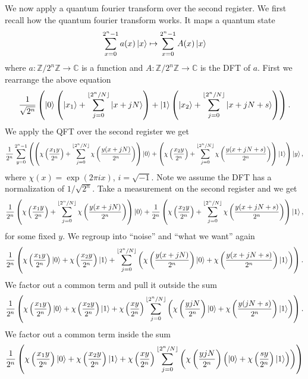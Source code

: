 \documentclass[10pt]{article}
\theoremstyle{plain}
\theoremstyle{definition}
\newcommand{\Z}{\mathbb{Z}}
\newcommand{\C}{\mathbb{C}}
\begin{document}
We now apply a quantum fourier transform over the second register.
We first recall how the quantum fourier transform works.
It maps a quantum state
\[
    \sum_{x=0}^{2^n-1} a(x)\ket{x} \mapsto \sum_{x=0}^{2^n-1} A(x)\ket{x}
\]
where \( a: \Z / 2^n \Z \to \C \) is a function and \( A : \Z / 2^n \Z \to \C\) is the DFT of \( a \).
First we rearrange the above equation
\[
    \frac{1}{\sqrt{2^n}} \left(\ket{0}\left(\ket{x_1} + \sum_{j=0}^{\lfloor 2^n / N \rfloor }\ket{x + jN} \right) + \ket{1} \left(\ket{x_2} + \sum_{j=0}^{\lfloor 2^n / N \rfloor }\ket{x + jN + s}\right) \right) .
\]
We apply the QFT over the second register we get
\[
    \frac{1}{2^n}\sum_{y = 0}^{2^n - 1} \left(  \left(\chi\left(\frac{x_1y}{ 2^n}\right) + \sum_{j = 0}^{\lfloor 2^n / N \rfloor } \chi\left(\frac{y(x+jN)}{2^n}\right) \right) \ket{0}  +  \left( \chi\left(\frac{x_2y}{ 2^n}\right) + \sum_{j = 0}^{\lfloor 2^n / N \rfloor } \chi\left(\frac{y(x+jN + s)}{2^n}\right)\right) \ket{1} \right)\ket{y} ,
\]
where \( \chi(x) = \exp(2\pi ix) \), \( i = \sqrt{-1} \).
Note we assume the DFT has a normalization of \( 1 / \sqrt{2^n} \).
Take a measurement on the second register and we get
\[
    \frac{1}{2^n}\left(\chi\left(\frac{x_1y}{ 2^n}\right) + \sum_{j = 0}^{\lfloor 2^n / N \rfloor } \chi\left(\frac{y(x+jN)}{2^n}\right) \right) \ket{0}  +  \frac{1}{2^n}\left( \chi\left(\frac{x_2y}{ 2^n}\right) + \sum_{j = 0}^{\lfloor 2^n / N \rfloor } \chi\left(\frac{y(x+jN + s)}{2^n}\right)\right) \ket{1} ,
\]
for some fixed \( y \).
We regroup into ``noise'' and ``what we want'' again
\[
    \frac{1}{2^n}
    \left(
    \chi\left(\frac{x_1y}{ 2^n}\right)\ket{0}
    + \chi\left(\frac{x_2y}{ 2^n}\right) \ket{1}
    + \sum_{j = 0}^{\lfloor 2^n / N \rfloor }
    \left(
        \chi\left(\frac{y(x+jN)}{2^n}\right) \ket{0}
        + \chi\left(\frac{y(x+jN + s)}{2^n}\right)\ket{1}
        \right)
    \right).
\]
We factor out a common term and pull it outside the sum
\[
    \frac{1}{2^n} \left(\chi\left(\frac{x_1y}{ 2^n}\right)\ket{0} + \chi\left(\frac{x_2y}{ 2^n}\right) \ket{1} + \chi\left(\frac{xy}{2^n}\right)\sum_{j = 0}^{\lfloor 2^n / N \rfloor } \left(\chi\left(\frac{yjN}{2^n}\right) \ket{0}  +    \chi\left(\frac{y(jN + s)}{2^n}\right)  \ket{1}\right)\right).
\]
We factor out a common term inside the sum
\[
    \frac{1}{2^n} \left(\chi\left(\frac{x_1y}{ 2^n}\right)\ket{0} + \chi\left(\frac{x_2y}{ 2^n}\right) \ket{1} + \chi\left(\frac{xy}{2^n}\right)
    \sum_{j = 0}^{\lfloor 2^n / N \rfloor }
    \left(
        \chi\left(\frac{yjN}{2^n}\right) \left( \ket{0}  +    \chi\left(\frac{sy}{2^n}\right)  \ket{1} \right) \right)\right)
\]
\end{document}
